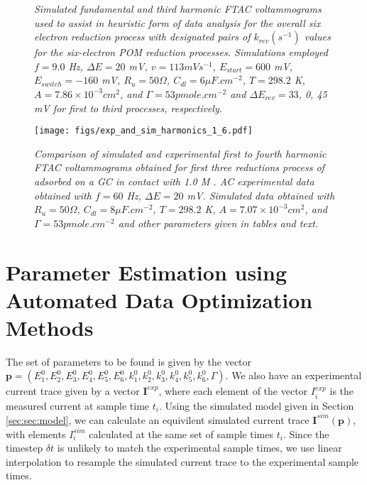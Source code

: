 \documentclass[a4paper, 12pt]{article}
\begin{document}
\begin{figure}[h]
    \caption{\it{Simulated fundamental and third harmonic FTAC voltammograms 
    used to assist in heuristic form of data analysis for the overall six 
    electron reduction process with designated pairs of $k_{rev} (s^{-1})$ 
    values for the six-electron POM reduction processes. Simulations employed $f 
    = 9.0$ Hz, $\Delta E = 20$ mV, $v = 113 mV s^{-1}$, $E_{start} = 600$ mV, 
    $E_{switch} = -160$ mV, $R_u = 50 \Omega$, $C_{dl} = 6 \mu F.cm^{-2}$, $T = 
    298.2$ K, $A = 7.86 \times 10^{-3} cm^2$, and $\Gamma = 53 pmole.cm^{-2}$ 
    and $\Delta E_{rev} = 33$, 0, 45 mV for first to third processes, 
    respectively.}}
    \label{fig:sim_for_heuristic_k}
\end{figure}

\begin{figure}[h]
\texttt{[image: figs/exp\_and\_sim\_harmonics\_1\_6.pdf]}
    \caption{\it{Comparison of simulated and experimental first to fourth 
    harmonic FTAC voltammograms obtained for first three reductions process of 
     adsorbed on a GC in contact with 1.0 M . AC 
    experimental data obtained with $f = 60$ Hz, $\Delta E = 20$ mV. Simulated 
    data obtained with $R_u = 50 \Omega$, $C_{dl} = 8 \mu F.cm^{-2}$, $T = 
    298.2$ K, $A = 7.07 \times 10^{-3} cm^2$, and $\Gamma = 53 pmole.cm^{-2}$ 
    and other parameters given in tables and text.}}
    \label{fig:sim_and_exp}
\end{figure}


\section{Parameter Estimation using Automated Data Optimization Methods}\label{sec:automated}

The set of parameters to be found is given by the vector $\mathbf{p} =
(E^0_1,E^0_2,E^0_3,E^0_4,E^0_5,E^0_6,k^0_1,k^0_2,k^0_3,k^0_4,k^0_5,k^0_6,\Gamma)$.
We also have an experimental current trace given by a vector $\mathbf{I}^{exp}$,
where each element of the vector $I^{exp}_i$ is the measured current at sample
time $t_i$. Using the simulated model given in Section \ref{sec:sec:model}, we
can calculate an equivilent simulated current trace
$\mathbf{I}^{sim}(\mathbf{p})$, with elements $I^{sim}_i$ calculated at the same
set of sample times $t_i$. Since the timestep $\delta t$ is unlikely to match
the experimental sample times, we use linear interpolation to resample the
simulated current trace to the experimental sample times.
\end{document}
